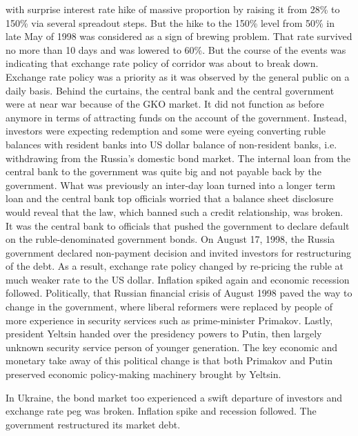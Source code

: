 with surprise interest rate hike of massive proportion by raising it
from 28\% to 150\% via several spreadout steps. But the hike to the 150\%
level from 50\% in late May of 1998 was considered as a sign of brewing
problem. That rate survived no more than 10 days and was lowered to 60\%.
But the course of the events was indicating that exchange rate policy of
corridor was about to break down. Exchange rate policy was a priority as
it was observed by the general public on a daily basis. Behind the
curtains, the central bank and the central government were at near war
because of the GKO market. It did not function as before anymore in
terms of attracting funds on the account of the government. Instead,
investors were expecting redemption and some were eyeing converting
ruble balances with resident banks into US dollar balance of
non-resident banks, i.e. withdrawing from the Russia's domestic bond
market. The internal loan from the central bank to the government was
quite big and not payable back by the government. What was previously an
inter-day loan turned into a longer term loan and the central bank top
officials worried that a balance sheet disclosure would reveal that the
law, which banned such a credit relationship, was broken. It was the
central bank to officials that pushed the government to declare default
on the ruble-denominated government bonds. On August 17, 1998, the
Russia government declared non-payment decision and invited investors
for restructuring of the debt. As a result, exchange rate policy changed
by re-pricing the ruble at much weaker rate to the US dollar. Inflation
spiked again and economic recession followed. Politically, that Russian
financial crisis of August 1998 paved the way to change in the
government, where liberal reformers were replaced by people of more
experience in security services such as prime-minister Primakov. Lastly,
president Yeltsin handed over the presidency powers to Putin, then
largely unknown security service person of younger generation. The key
economic and monetary take away of this political change is that both
Primakov and Putin preserved economic policy-making machinery brought by
Yeltsin.

In Ukraine, the bond market too experienced a swift departure of
investors and exchange rate peg was broken. Inflation spike and
recession followed. The government restructured its market debt.

